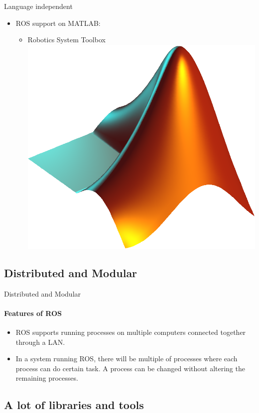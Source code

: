 \documentclass{beamer}
\begin{document}
\begin{frame}{Language independent}
{\begin{minipage}{\textwidth}
\begin{itemize}
\begin{itemize}
        \end{itemize}
        \item ROS support on MATLAB:
        \begin{itemize}
            \item Robotics System Toolbox \hspace{4.3cm} \includegraphics[width=.06\linewidth]{figures/matlab_logo.png}
        \end{itemize}
    \end{itemize}
\end{minipage}%
}
\end{frame}


\subsection{Distributed and Modular}

\begin{frame}{Distributed and Modular}
    \framesubtitle{Features of ROS}    
    \begin{itemize}
        \item ROS supports running processes on multiple computers connected together through a LAN.
        \item In a system running ROS, there will be multiple of processes where each process can do
        certain task. A process can be changed without altering the remaining processes.
    \end{itemize}
\end{frame}


\subsection{A lot of libraries and tools}
\end{document}
